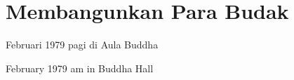 \chapter{Membangunkan Para Budak} %

 Februari 1979 pagi di Aula Buddha

 February 1979 am in Buddha Hall

